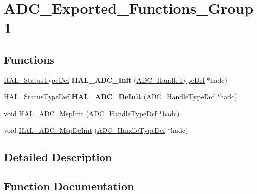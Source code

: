 \hypertarget{group___a_d_c___exported___functions___group1}{}\section{A\+D\+C\+\_\+\+Exported\+\_\+\+Functions\+\_\+\+Group1}
\label{group___a_d_c___exported___functions___group1}
\subsection*{Functions}
\begin{DoxyCompactItemize}
\item 
\mbox{\label{group___a_d_c___exported___functions___group1_ga33ddb73d4880bd425aaa43c5c52bb13a}} 
\mbox{\hyperlink{stm32f7xx__hal__def_8h_a63c0679d1cb8b8c684fbb0632743478f}{H\+A\+L\+\_\+\+Status\+Type\+Def}} {\bfseries H\+A\+L\+\_\+\+A\+D\+C\+\_\+\+Init} (\mbox{\hyperlink{struct_a_d_c___handle_type_def}{A\+D\+C\+\_\+\+Handle\+Type\+Def}} $\ast$hadc)
\item 
\mbox{\label{group___a_d_c___exported___functions___group1_ga165940b437c6a8843c6032199adbf0a8}} 
\mbox{\hyperlink{stm32f7xx__hal__def_8h_a63c0679d1cb8b8c684fbb0632743478f}{H\+A\+L\+\_\+\+Status\+Type\+Def}} {\bfseries H\+A\+L\+\_\+\+A\+D\+C\+\_\+\+De\+Init} (\mbox{\hyperlink{struct_a_d_c___handle_type_def}{A\+D\+C\+\_\+\+Handle\+Type\+Def}} $\ast$hadc)
\item 
void \mbox{\hyperlink{group___a_d_c___exported___functions___group1_gaa30863492d5c3103e3e8ce8a63dadd07}{H\+A\+L\+\_\+\+A\+D\+C\+\_\+\+Msp\+Init}} (\mbox{\hyperlink{struct_a_d_c___handle_type_def}{A\+D\+C\+\_\+\+Handle\+Type\+Def}} $\ast$hadc)
\item 
void \mbox{\hyperlink{group___a_d_c___exported___functions___group1_ga39b0f8e80268ab3e660ead921ad4b22f}{H\+A\+L\+\_\+\+A\+D\+C\+\_\+\+Msp\+De\+Init}} (\mbox{\hyperlink{struct_a_d_c___handle_type_def}{A\+D\+C\+\_\+\+Handle\+Type\+Def}} $\ast$hadc)
\end{DoxyCompactItemize}


\subsection{Detailed Description}


\subsection{Function Documentation}
\mbox{\label{group___a_d_c___exported___functions___group1_ga39b0f8e80268ab3e660ead921ad4b22f}} 
